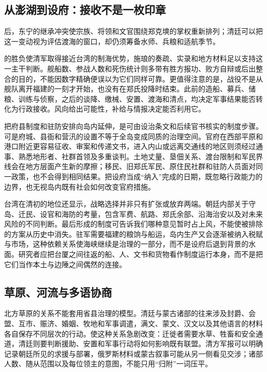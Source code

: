 \subsection*{从澎湖到设府：接收不是一枚印章}
后，东宁的继承冲突使宗族、将领和文官围绕郑克塽的掌权重新排列；清廷可以把这一变动视为评估渡海的窗口，却仍须筹备水师、兵粮和适航季节。

的胜负使清军取得接近台湾的制海优势，施琅的奏疏、实录和地方材料足以支持这一主干判断。舰船数、参战人数和死伤统计则多带有胜方报功、败方自辩或后出整合的目的，不能因数字精确便误以为它们同样可靠。更值得注意的是，战役不是从舰队离开福建的一刻才开始，也没有在郑氏投降时结束。此前的造船、募兵、储粮、训练与侦察，之后的谈降、缴械、安置、渡海和清点，均决定军事结果能否转化为行政接收。风向给出可能性，补给与情报决定能否利用它。

把府县制度和驻防安排向岛内延伸，是可由设治条文和后续官书核实的制度步骤。可是府城、县衙和营汛的设置不等于全岛变成同质的治理空间。官府在西部平原和港口附近更容易征收、审案和传递文书，进入内山或远离交通线的地区则须经过通事、熟悉地形者、社群首领及多重谈判。土地丈量、垦佃关系、渡台限制和军民界线会在地方层面产生新的摩擦；移民、旧郑氏军民、原住民社群和驻防人员面对同一政策，也不会得到相同结果。把设府当成“纳入”完成的日期，既忽略行政能力的边界，也无视岛内既有社会如何改变官府措施。

台湾在清初的地位还显示，战略选择并非只有扩张或放弃两端。朝廷内部关于守岛、迁民、设官和海防的考量，包含军费、航路、郑氏余部、沿海治安以及对未来风险的不同判断。最后形成的制度可告诉我们哪种意见暂时占上风，不能使被排除的方案从历史中消失。驻军需要福建的粮饷与船运，岛内生产又会逐渐被纳入税赋与市场，这种依赖关系使海峡继续是治理的一部分，而不是设府后退到背景的水面。研究者应把台厦之间往返的船、人、文书和货物看作制度运行本身，而不是把它们当作本土与边陲之间偶然的连接。

\subsection*{草原、河流与多语协商}
北方草原的关系不能套用省县治理的模型。清廷与蒙古诸部的往来涉及封爵、会盟、互市、赈济、婚姻、牧地和军事调遣，满文、蒙文、汉文以及其他语言的材料各自保存不同层次的行动。使这种关系急剧改变：迁徙者需要水草、牲畜和安全通道，清廷则要判断援助、安置和军事行动将如何影响既有联盟。清方军报可以明确记录朝廷所见的求援与部署，俄罗斯材料或蒙古叙事可能从另一侧看见交涉；诸部人数、随从范围以及每位领主的意图，不能只用“归附”一词压平。

